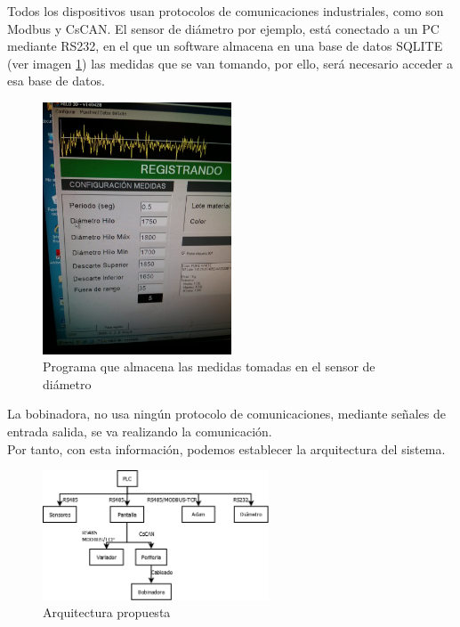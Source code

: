 Todos los dispositivos usan protocolos de comunicaciones industriales, como son Modbus y CsCAN. El sensor de diámetro por ejemplo, está conectado a un PC mediante 
RS232, en el que un software almacena en una base de datos SQLITE (ver imagen \ref{fig:hardware_sensor_diametro}) las medidas que se van tomando, por ello, será necesario acceder a esa base de datos.
 	\begin{figure}[H]
            \centering
            \includegraphics[width=0.5\textwidth]{images/Parametros_adquisicin.jpg}
            \caption{Programa que almacena las medidas tomadas en el sensor de diámetro}
            \label{fig:hardware_sensor_diametro}
    \end{figure}

La bobinadora, no usa ningún protocolo de comunicaciones, mediante señales de entrada salida, se va realizando la comunicación.\\

Por tanto, con esta información, podemos establecer la arquitectura del sistema.\\

 	\begin{figure}[H]
            \centering
            \includegraphics[width=0.6\textwidth]{images/20141229.png}
            \caption{Arquitectura propuesta}
            \label{fig:hardware_arquitectura}
    \end{figure}

